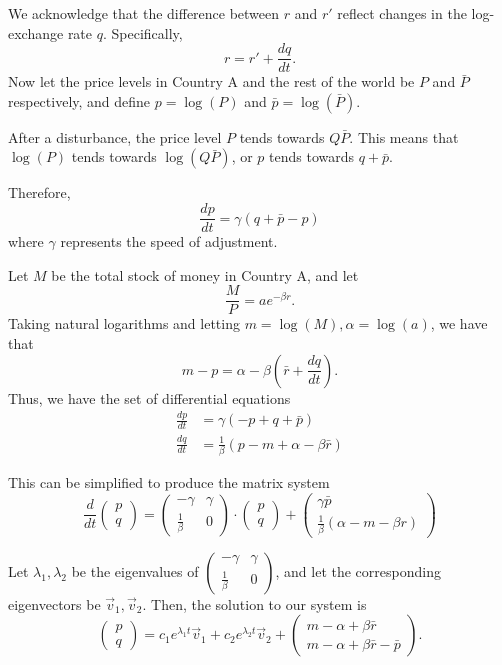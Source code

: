 \documentclass[a4paper, 12pt,oneside,openany]{book}
\begin{document}
We acknowledge that the difference between $r$ and $r'$ reflect changes in the log-exchange rate $q$. Specifically, $$r=r'+\frac{dq}{dt}.$$ Now let the price levels in Country A and the rest of the world be $P$ and $\bar{P}$ respectively, and define $p =\log(P)$ and $\bar{p} = \log(\bar{P})$. 

After a disturbance, the price level $P$ tends towards $Q\bar{P}$. This means that $\log(P)$ tends towards $\log(Q\bar{P})$, or $p$ tends towards $q+\bar{p}.$

Therefore, $$\frac{dp}{dt} = \gamma(q+\bar{p}-p)$$ where $\gamma$ represents the speed of adjustment.

Let $M$ be the total stock of money in Country A, and let $$\frac{M}{P}=ae^{-\beta r}.$$ Taking natural logarithms and letting $m=\log(M), \alpha = \log(a)$, we have that $$m-p = \alpha-\beta \left(\bar{r}+\frac{dq}{dt}\right).$$ Thus, we have the set of differential equations \begin{align*} \frac{dp}{dt} &= \gamma (-p+q+\bar{p}) \\ \frac{dq}{dt} &= \frac{1}{\beta}(p-m+\alpha-\beta \bar{r}) \end{align*}

This can be simplified to produce the matrix system $$\frac{d}{dt} \begin{pmatrix} p\\q \end{pmatrix} = \begin{pmatrix} -\gamma & \gamma \\ \frac{1}{\beta} & 0 \end{pmatrix} \cdot \begin{pmatrix} p\\q \end{pmatrix} + \begin{pmatrix} \gamma \bar{p} \\ \frac{1}{\beta}(\alpha -m-\beta r) \end{pmatrix}$$

Let $\lambda_1, \lambda_2$ be the eigenvalues of $\begin{pmatrix} -\gamma & \gamma \\ \frac{1}{\beta} & 0 \end{pmatrix}$, and let the corresponding eigenvectors be $\vec{v}_1, \vec{v}_2$. Then, the solution to our system is $$\begin{pmatrix} p\\q \end{pmatrix} = c_1 e^{\lambda_1 t} \vec{v}_1 + c_2 e^{\lambda_2 t} \vec{v}_2 + \begin{pmatrix} m-\alpha+\beta\bar{r} \\ m-\alpha+\beta\bar{r}-\bar{p} \end{pmatrix}.$$
\end{document}
